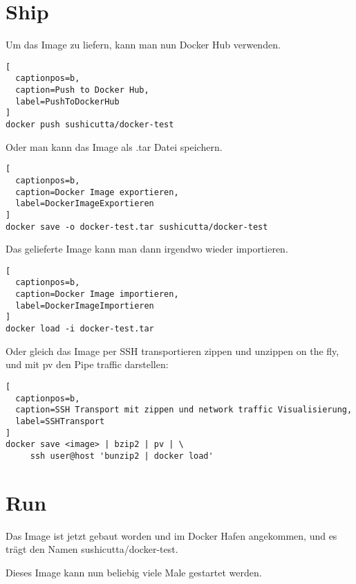 \section{Ship}

Um das Image zu liefern, kann man nun Docker Hub verwenden.

\begin{lstlisting}[
  captionpos=b,
  caption=Push to Docker Hub,
  label=PushToDockerHub
]
docker push sushicutta/docker-test
\end{lstlisting}

Oder man kann das Image als .tar Datei speichern.

\begin{lstlisting}[
  captionpos=b,
  caption=Docker Image exportieren,
  label=DockerImageExportieren
]
docker save -o docker-test.tar sushicutta/docker-test
\end{lstlisting}

Das gelieferte Image kann man dann irgendwo wieder importieren.

\begin{lstlisting}[
  captionpos=b,
  caption=Docker Image importieren,
  label=DockerImageImportieren
]
docker load -i docker-test.tar
\end{lstlisting}

Oder gleich das Image per SSH transportieren zippen und unzippen on the fly, und mit pv den
Pipe traffic darstellen:

\begin{lstlisting}[
  captionpos=b,
  caption=SSH Transport mit zippen und network traffic Visualisierung,
  label=SSHTransport
]
docker save <image> | bzip2 | pv | \
     ssh user@host 'bunzip2 | docker load'
\end{lstlisting}

\section{Run}

Das Image ist jetzt gebaut worden und im Docker Hafen angekommen, und es trägt den Namen
sushicutta/docker-test.

Dieses Image kann nun beliebig viele Male gestartet werden.

